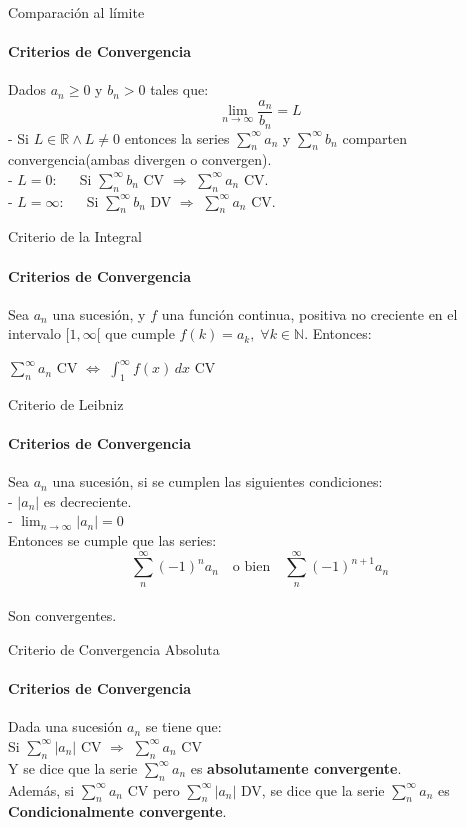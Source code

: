 \documentclass{plantillaPPT}
\begin{document}
\begin{frame}{Comparación al límite}
\framesubtitle{Criterios de Convergencia}

Dados \(a_n \geq 0\) y \(b_n>0\) tales que:
\[\lim_{n\to\infty}\frac{a_n}{b_n}=L\]
- Si \(L\in\mathbb{R} \land L\neq0\) entonces la series \(\displaystyle\sum_{n}^{\infty}a_n\) y \(\displaystyle\sum_{n}^{\infty}b_n\) comparten convergencia(ambas divergen o convergen).\\[2ex]
- \(L = 0\): \(\quad\) Si \(\displaystyle\sum_{n}^{\infty}b_n\) CV \(\Rightarrow\) \(\displaystyle\sum_{n}^{\infty}a_n\) CV. \\[2ex]
- \(L = \infty\): \(\quad\) Si \(\displaystyle\sum_{n}^{\infty}b_n\) DV \(\Rightarrow\) \(\displaystyle\sum_{n}^{\infty}a_n\) CV.

\end{frame}

\begin{frame}{Criterio de la Integral}
\framesubtitle{Criterios de Convergencia}

Sea \(a_n\) una sucesión, y \(f\) una función continua, positiva no creciente en el intervalo \([1,\infty[\) que cumple \(f(k) = a_k, \; \forall k\in\mathbb{N}\). Entonces:\\[4ex]
\begin{center}
\(\displaystyle\sum_{n}^{\infty}a_n\) CV \(\Longleftrightarrow\) \(\displaystyle\int_1^{\infty}f(x)\,dx\) CV
\end{center}
\end{frame}

\begin{frame}{Criterio de Leibniz}
\framesubtitle{Criterios de Convergencia}

Sea \(a_n\) una sucesión, si se cumplen las siguientes condiciones:\\[2ex]
- \(|a_n|\) es decreciente.\\[2ex]
- \(\displaystyle\lim_{n\to\infty}|a_n| = 0\)\\[2ex]
Entonces se cumple que las series:\\[2ex]
\[\sum_{n}^\infty (-1)^{n} a_n \quad \text{o bien} \quad \sum_{n}^\infty (-1)^{n+1} a_n\]\\[2ex]
Son convergentes.

\end{frame}

\begin{frame}{Criterio de Convergencia Absoluta}
\framesubtitle{Criterios de Convergencia}

Dada una sucesión \(a_n\) se tiene que:\\[2ex]
Si \(\displaystyle\sum_{n}^\infty |a_n|\) CV \(\Rightarrow\) \(\displaystyle\sum_{n}^\infty a_n\) CV\\[2ex]
Y se dice que la serie \(\displaystyle\sum_{n}^\infty a_n\) es \textbf{absolutamente convergente}.\\[4ex]
Además, si \(\displaystyle\sum_{n}^\infty a_n\) CV pero \(\displaystyle\sum_{n}^\infty |a_n|\) DV, se dice que la serie \(\displaystyle\sum_{n}^\infty a_n\) es \textbf{Condicionalmente convergente}.
\end{frame}
\end{document}
